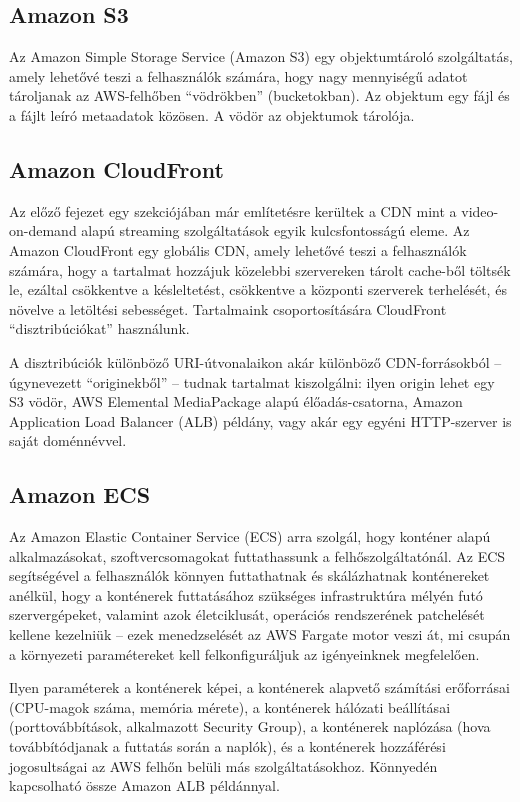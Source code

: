 \subsection{Amazon S3}

Az Amazon Simple Storage Service (Amazon S3) egy objektumtároló szolgáltatás, amely lehetővé teszi a felhasználók számára, hogy nagy mennyiségű adatot tároljanak az AWS-felhőben ``vödrökben'' (bucketokban). Az objektum egy fájl és a fájlt leíró metaadatok közösen. A vödör az objektumok tárolója.

\subsection{Amazon CloudFront}

Az előző fejezet egy szekciójában már említetésre kerültek a CDN mint a video-on-demand alapú streaming szolgáltatások egyik kulcsfontosságú eleme. Az Amazon CloudFront egy globális CDN, amely lehetővé teszi a felhasználók számára, hogy a tartalmat hozzájuk közelebbi szervereken tárolt cache-ből töltsék le, ezáltal csökkentve a késleltetést, csökkentve a központi szerverek terhelését, és növelve a letöltési sebességet. Tartalmaink csoportosítására CloudFront ``disztribúciókat'' használunk.

A disztribúciók különböző URI-útvonalaikon akár különböző CDN-forrásokból -- úgynevezett ``originekből'' -- tudnak tartalmat kiszolgálni: ilyen origin lehet egy S3 vödör, AWS Elemental MediaPackage alapú élőadás-csatorna, Amazon Application Load Balancer (ALB) példány, vagy akár egy egyéni HTTP-szerver is saját doménnévvel.

\subsection{Amazon ECS}

Az Amazon Elastic Container Service (ECS) arra szolgál, hogy konténer alapú alkalmazásokat, szoftvercsomagokat futtathassunk a felhőszolgáltatónál. Az ECS segítségével a felhasználók könnyen futtathatnak és skálázhatnak konténereket anélkül, hogy a konténerek futtatásához szükséges infrastruktúra mélyén futó szervergépeket, valamint azok életciklusát, operációs rendszerének patchelését kellene kezelniük -- ezek menedzselését az AWS Fargate motor veszi át, mi csupán a környezeti paramétereket kell felkonfiguráljuk az igényeinknek megfelelően.

Ilyen paraméterek a konténerek képei, a konténerek alapvető számítási erőforrásai (CPU-magok száma, memória mérete), a konténerek hálózati beállításai (porttovábbítások, alkalmazott Security Group), a konténerek naplózása (hova továbbítódjanak a futtatás során a naplók), és a konténerek hozzáférési jogosultságai az AWS felhőn belüli más szolgáltatásokhoz. Könnyedén kapcsolható össze Amazon ALB példánnyal.

